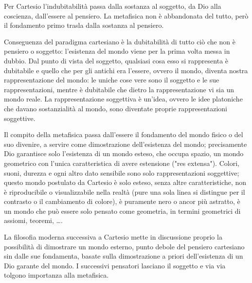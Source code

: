 \documentclass[a4paper,12pt,oneside]{article}%
\begin{document}
Per Cartesio l'indubitabilità passa dalla sostanza al soggetto, da Dio alla coscienza, dall'essere al pensiero. La metafisica non è abbandonata del tutto, però il fondamento primo trasla dalla sostanza al pensiero.

Conseguenza del paradigma cartesiano è la dubitabilità di tutto ciò che non è pensiero o soggetto: l'esistenza del mondo viene per la prima volta messa in dubbio. Dal punto di vista del soggetto, qualsiasi cosa esso si rappresenta è dubitabile e quello che per gli antichi era l'essere, ovvero il mondo, diventa nostra rappresentazione del mondo: le uniche cose vere sono il soggetto e le sue rappresentazioni, mentre è dubitabile che dietro la rappresentazione vi sia un mondo reale. La rappresentazione soggettiva è un'idea, ovvero le idee platoniche che davano sostanzialità al mondo, sono diventate proprie rappresentazioni soggettive.

Il compito della metafisica passa dall'essere il fondamento del mondo fisico o del suo divenire, a servire come dimostrazione dell'esistenza del mondo; precisamente Dio garantisce solo l'esistenza di un mondo esteso, che occupa spazio, un mondo geometrico con l'unica caratteristica di avere estensione ("res extensa"). Colori, suoni, durezza e ogni altro dato sensibile sono solo rappresentazioni soggettive; questo mondo postulato da Cartesio è solo esteso, senza altre caratteristiche, non è riproducibile o visualizzabile nella realtà (pure una sola linea si distingue per il contrasto o il cambiamento di colore), è puramente nero o ancor più astratto, è un mondo che può essere solo pensato come geometria, in termini geometrici di assiomi, teoremi, \dots.

La filosofia moderna successiva a Cartesio mette in discussione proprio la possibilità di dimostrare un mondo esterno, punto debole del pensiero cartesiano sin dalle sue fondamenta, basate sulla dimostrazione a priori dell'esistenza di un Dio garante del mondo. I successivi pensatori lasciano il soggetto e via via tolgono importanza alla metafisica.
\end{document}
